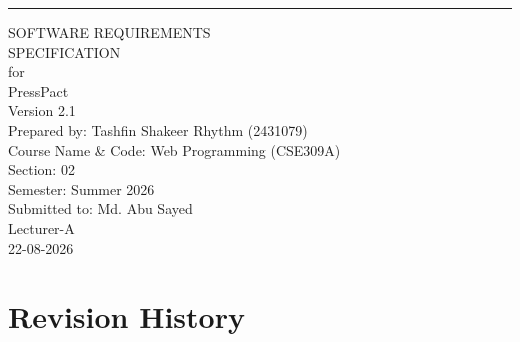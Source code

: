 \documentclass{scrreprt}
\date{}
\def\myversion{2.1}
\begin{document}
\begin{flushright}
    \rule{\textwidth}{5pt}\vskip0.6cm
    \begin{bfseries}
        \Huge{SOFTWARE REQUIREMENTS\\ SPECIFICATION}\\
        \vspace{0.6cm}
        for\\
        \vspace{0.6cm}
        PressPact\\
        \vspace{0.6cm}
        \LARGE{Version \myversion}\\
        \vspace{0.8cm}
        Prepared by: Tashfin Shakeer Rhythm (2431079)\\
        \vspace{0.6cm}
        Course Name \& Code: Web Programming (CSE309A)\\
        Section: 02\\
        Semester: Summer 2026\\
        \vspace{0.6cm}
        Submitted to: Md. Abu Sayed \\Lecturer-A\\
        \vspace{0.8cm}
        22-08-2026\\
    \end{bfseries}
\end{flushright}

\tableofcontents
\clearpage

\chapter*{Revision History}
\end{document}
